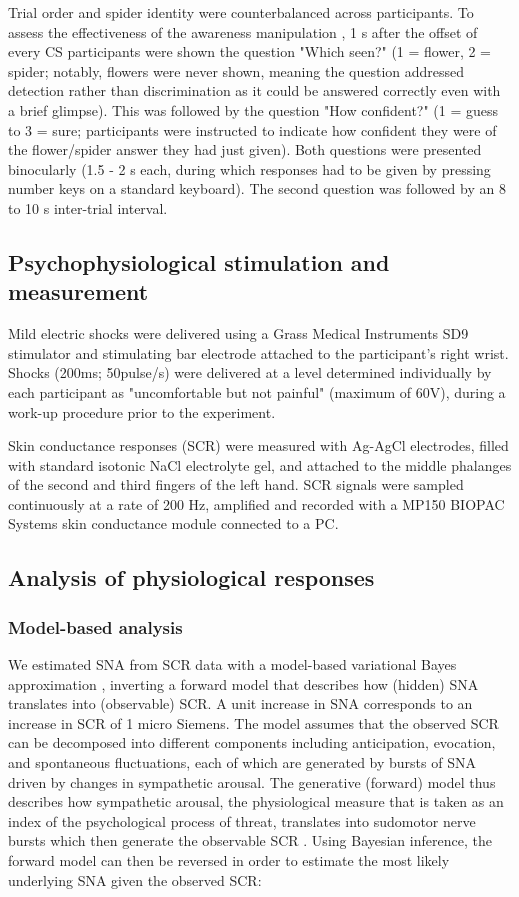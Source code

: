 \documentclass[12pt]{article}
\begin{document}
Trial order and spider identity were counterbalanced across
participants. To assess the effectiveness of the awareness
manipulation \cite{Merikle2001}, 1 s after the offset of every CS
participants were shown the question "Which seen?" (1 = flower, 2 =
spider; notably, flowers were never shown, meaning the question
addressed detection rather than discrimination as it could be answered
correctly even with a brief glimpse). This was followed by the question
"How confident?" (1 = guess to 3 = sure; participants were instructed to
indicate how confident they were of the flower/spider answer they had
just given). Both questions were presented binocularly (1.5 - 2 s each,
during which responses had to be given by pressing number keys on a
standard keyboard). The second question was followed by an 8 to 10 s
inter-trial interval.

\subsection*{Psychophysiological stimulation and measurement}
\label{sec:org3083f09}
Mild electric shocks were delivered using a Grass Medical Instruments
SD9 stimulator and stimulating bar electrode attached to the
participant's right wrist. Shocks (200ms; 50pulse/s) were delivered at a
level determined individually by each participant as "uncomfortable but
not painful" (maximum of 60V), during a work-up procedure prior to the
experiment.  

Skin conductance responses (SCR) were measured with Ag-AgCl electrodes,
filled with standard isotonic NaCl electrolyte gel, and attached to the
middle phalanges of the second and third fingers of the left hand. SCR
signals were sampled continuously at a rate of 200 Hz, amplified and
recorded with a MP150 BIOPAC Systems skin conductance module connected
to a PC.

\subsection*{Analysis of physiological responses}
\label{sec:org63ea6a0}
\subsubsection*{Model-based analysis}
\label{sec:org6f85e1c}
We estimated SNA from SCR data with a model-based variational Bayes
approximation \cite{Bach2010}, inverting a forward model that
describes how (hidden) SNA translates into (observable) SCR. A unit
increase in SNA corresponds to an increase in SCR of 1 micro
Siemens. The model assumes that the observed SCR can be decomposed into
different components including anticipation, evocation, and spontaneous
fluctuations, each of which are generated by bursts of SNA driven by
changes in sympathetic arousal. The generative (forward) model thus
describes how sympathetic arousal, the physiological measure that is
taken as an index of the psychological process of threat, translates
into sudomotor nerve bursts which then generate the observable SCR
\cite{Bach2010}. Using Bayesian inference, the forward model can then
be reversed in order to estimate the most likely underlying SNA given
the observed SCR:
\end{document}
